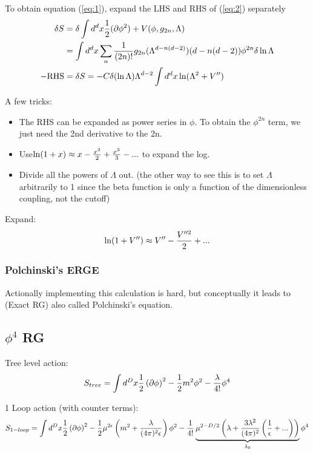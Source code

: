 \documentclass[11pt]{scrartcl}
\begin{document}
\begin{example}
	To obtain equation  (\ref{eq:1}), expand the LHS and RHS of (\ref{eq:2}) separately
	\begin{align}
		\delta S &= \delta \int d^d x \frac12 (\partial \phi^2) + V(\phi, g_{2n}, \Lambda) \\
		& = \int d^d x \sum_{n} {1 \over (2n)!} g_{2n}(\Lambda^{d-n(d-2)}) (d - n(d-2))  \phi^{2n} \delta \ln \Lambda \\
		-\text{RHS} &= \delta S =  - C \delta( \ln \Lambda) \Lambda^{d-2}  \int d^d x  \ln(\Lambda^2 + V'')
		\end{align}
	
	A few tricks:
	\begin{itemize}
		\item The RHS can be expanded as power series in $\phi$.  To obtain the $\phi^{2n}$ term, we just need the 2nd derivative to the 2n.
		\item Use$\ln(1 + x) \approx x - {x^2 \over 2} + {x^3 \over 3} -...$ to expand the log.
		\item Divide all the powers of $\Lambda$ out. (the other way to see this is to set $\Lambda$ arbitrarily to 1 since the beta function is only a function of the dimensionless coupling, not the cutoff)
	\end{itemize}
	Expand:
	\begin{align}
		\ln(1 + V'') \approx  {V''} - {V''^2 \over 2} + ...
		\end{align}
	\end{example}



\subsubsection{Polchinski's ERGE}

Actionally implementing this calculation is hard, but conceptually it leads to  (Exact RG) also called Polchinski's equation.

\subsection{$\phi^4$ RG}
Tree level action:
\begin{align}
	S_{tree} = \int d^D x \frac12  \left( \partial \phi \right)^2 - \frac12 m^2 \phi^2 - {\lambda \over 4!} \phi^4
\end{align}

1 Loop action (with counter terms):
\begin{align}
	S_{1 -loop} = \int d^D x \frac12  \left( \partial \phi \right)^2 - \frac12 \mu^{2 \epsilon} \left(m^2 + {\lambda\over (4 \pi)^2 \epsilon} \right) \phi^2 - {1\over 4!} \underbrace{  \mu^{2-D/2}  \left(\lambda + {3 \lambda^2 \over (4 \pi)^2 } \left({1 \over \epsilon} + ... \right) \right)}_{\lambda_0} \phi^4
\end{align}
\end{document}
